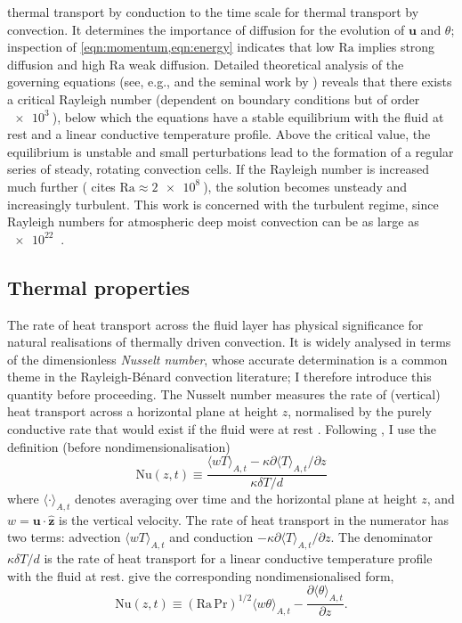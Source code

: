 \documentclass[titlepage,twoside]{article}
\numberwithin{equation}{section}
\newcommand{\pdiff}[2]{\frac{\partial #1}{\partial #2}}
\renewcommand\vec{\bm}
\newcommand{\uvec}[1]{\vec{\hat{#1}}}
\newcommand{\prandtl}{\ensuremath{\mathrm{Pr}}}
\newcommand{\rayleigh}{\ensuremath{\mathrm{Ra}}}
\newcommand{\nusselt}{\ensuremath{\mathrm{Nu}}}
\newcommand{\rb}{Rayleigh-B\'{e}nard}
\begin{document}
thermal transport by conduction to the time scale for
thermal transport by convection. It determines the importance of diffusion for the evolution of
$\vec{u}$ and $\theta$; inspection of \cref{eqn:momentum,eqn:energy} indicates
that low $\rayleigh$ implies strong diffusion and high $\rayleigh$ weak
diffusion. Detailed theoretical analysis of the governing equations (see, e.g.,
\textcite{chandrasekhar1961} and the seminal work by \textcite{rayleigh1916})
reveals that there exists a critical Rayleigh number (dependent on boundary
conditions but of order $\SI{e3}{}$), below which the equations have a stable
equilibrium with the fluid at rest and a linear conductive temperature profile.
Above the critical value, the equilibrium is unstable and small perturbations
lead to the formation of a regular series of steady, rotating convection cells.
If the Rayleigh number is increased much further (\textcite{le_quere1991} cites
$\rayleigh \approx \SI{2e8}{}$), the solution becomes unsteady and increasingly
turbulent. This work is concerned with the turbulent regime, since Rayleigh
numbers for atmospheric deep moist convection can be as large as $\SI{e22}{}$
\parencite{chilla2012}.

\subsection{Thermal properties}
The rate of heat transport across the fluid layer has physical significance for
natural realisations of thermally driven convection. It is widely analysed in
terms of the dimensionless \emph{Nusselt number}, whose accurate determination
is a common theme in the \rb{} convection literature; I therefore introduce
this quantity before proceeding. The Nusselt number measures the rate of
(vertical) heat transport across a horizontal plane at height $z$, normalised
by the purely conductive rate that would exist if the fluid were at rest
\parencite{verzicco1999}. Following \textcite{chilla2012}, I use the definition
(before nondimensionalisation)
\begin{equation}
    \label{eqn:dim_nusselt}
    \nusselt(z,t) \equiv \frac{
        \langle wT \rangle_{A,t}
        - \kappa \partial \langle T \rangle_{A,t} / \partial z
    }{
        \kappa \delta T / d
    }
\end{equation}
where $\langle \cdot \rangle_{A,t}$ denotes averaging over time and the
horizontal plane at height $z$, and $w = \vec{u} \cdot \uvec{z}$ is the
vertical velocity. The rate of heat transport in the numerator has two terms:
advection $\langle wT \rangle_{A,t}$ and conduction $-\kappa \partial \langle T
\rangle_{A,t} / \partial z$. The denominator $\kappa \delta T / d$ is the rate
of heat transport for a linear conductive temperature profile with the fluid at
rest. \textcite{scheel2013} give the corresponding nondimensionalised form,
\begin{equation}
    \label{eqn:nusselt}
    \nusselt(z,t) \equiv (\rayleigh\,\prandtl)^{1/2}
        \langle w \theta \rangle_{A,t}
        - \pdiff{\langle \theta \rangle_{A,t}}{z}.
\end{equation}
\end{document}
